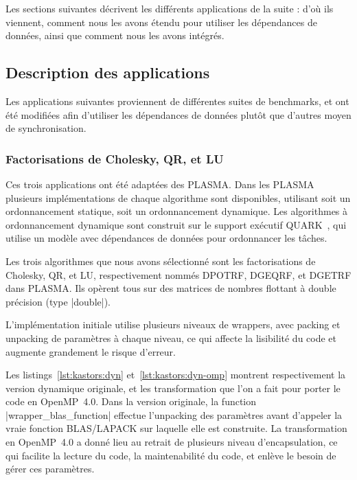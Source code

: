 Les sections suivantes décrivent les différents applications de la suite : d'où ils viennent, comment nous les avons étendu pour utiliser les dépendances de données, ainsi que comment nous les avons intégrés.


\subsection{Description des applications}

Les applications suivantes proviennent de différentes suites de benchmarks, et ont été modifiées afin d'utiliser les dépendances de données plutôt que d'autres moyen de synchronisation.

\subsubsection{Factorisations de Cholesky, QR, et LU}

Ces trois applications ont été adaptées des PLASMA.
Dans les PLASMA plusieurs implémentations de chaque algorithme sont disponibles, utilisant soit un ordonnancement statique, soit un ordonnancement dynamique.
Les algorithmes à ordonnancement dynamique sont construit sur le support exécutif QUARK~\cite{YarKhan2011}, qui utilise un modèle avec dépendances de données pour ordonnancer les tâches.

Les trois algorithmes que nous avons sélectionné sont les factorisations de Cholesky, QR, et LU, respectivement nommés DPOTRF, DGEQRF, et DGETRF dans PLASMA.
Ils opèrent tous sur des matrices de nombres flottant à double précision (type |double|).

L'implémentation initiale utilise plusieurs niveaux de wrappers, avec packing et unpacking de paramètres à chaque niveau, ce qui affecte la lisibilité du code et augmente grandement le risque d'erreur.

Les listings~\ref{lst:kastors:dyn} et~\ref{lst:kastors:dyn-omp} montrent respectivement la version dynamique originale, et les transformation que l'on a fait pour porter le code en OpenMP~4.0.
Dans la version originale, la function |wrapper_blas_function| effectue l'unpacking des paramètres avant d'appeler la vraie fonction BLAS/LAPACK sur laquelle elle est construite.
La transformation en OpenMP~4.0 a donné lieu au retrait de plusieurs niveau d'encapsulation, ce qui facilite la lecture du code, la maintenabilité du code, et enlève le besoin de gérer ces paramètres.

